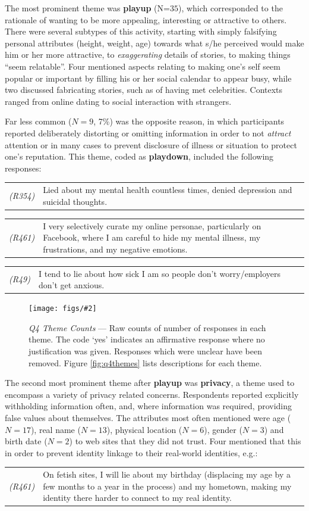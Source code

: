 \documentclass{sig-alternate}
\newcommand{\fig}[3][1.0]{
\begin{figure}[tbp]
\begin{center}
\texttt{[image: figs/\#2]}
\protect\caption{#3}
\label{fig:#2}
\end{center}
\end{figure}
}
\newcommand{\comment}[1]{\textbf{\color{green}((#1))}}
\newcommand{\example}[2]{%

\vspace{0.10cm}

\hspace{-3.9ex} \begin{tabular}{ p{0.6cm} p{7.15cm} }
    {\it \small (R#1)} & #2 \\
\end{tabular}%
\vspace{0.10cm}

}
\begin{document}
The most prominent theme was \textbf{playup} (N=$35$), which corresponded to the rationale of wanting to be more appealing, interesting or attractive to others.  There were several subtypes of this activity, starting with simply falsifying personal attributes (height, weight, age) towards what s/he perceived would make him or her more attractive, to \emph{exaggerating} details of stories, to making things ``seem relatable''. Four mentioned aspects relating to making one's self seem popular or important by filling his or her social calendar to appear busy, while two discussed fabricating stories, such as of having met celebrities.  Contexts ranged from online dating to social interaction with strangers. 


Far less common ($N=9$, 7\%) was the opposite reason, in which participants reported deliberately distorting or omitting information in order to not \emph{attract} attention or in many cases to prevent disclosure of illness or situation to protect one's reputation.  This theme, coded as \textbf{playdown}, included the following responses:

\example{354}{Lied about my mental health countless times, denied depression and suicidal thoughts. }
\example{461}{I very selectively curate my online personae, particularly on Facebook, where I am careful to hide my mental illness, my frustrations, and my negative emotions.}
\example{49}{I tend to lie about how sick I am so people don't worry/employers don't get anxious.}


\fig{q4frequency}{\emph{Q4 Theme Counts} --- Raw counts of number of responses in each theme. The code `yes' indicates an affirmative response where no  justification was given. Responses which were unclear have been removed. Figure \ref{fig:q4themes} lists descriptions for each theme.}


The second most prominent theme after \textbf{playup} was \textbf{privacy}, a theme used to encompass a variety of privacy related concerns.  Respondents reported explicitly withholding information often, and, where information was required, providing false values about themselves.  The attributes most often mentioned were age ($N=17$), real name ($N=13$), physical location ($N=6$), gender ($N=3$) and birth date ($N=2$) to web sites that they did not trust.  Four mentioned that this in order to prevent identity linkage to their real-world identities, e.g.:
\example{461}{On fetish sites, I will lie about my birthday (displacing my age by a few months to a year in the process) and my hometown, making my identity there harder to connect to my real identity.}
\end{document}
